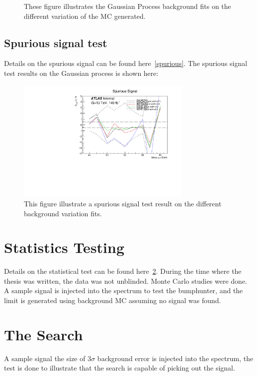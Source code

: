 \begin{figure}[!htb]
\begin{center}
        \caption{
        These figure illustrates the Gaussian Process background fits on the different variation of the MC generated. }
    \end{center}
\end{figure}



\subsection{Spurious signal test}
Details on the spurious signal can be found here~\ref{spurious}.
The spurious signal test results on the Gaussian process is shown here:

\begin{figure}[!htb]
    \begin{center}
        \includegraphics[width=0.75\textwidth]{figures/chapter_dimuon/spurious}        
        \caption{
        This figure illustrate a spurious signal test result on the different background variation fits.}
            \label{fig:dimuonstudies}
    \end{center}
\end{figure}


\section{Statistics Testing}
Details on the statistical test can be found here~\ref{}. During the time where the thesis was written, the data was not unblinded. Monte Carlo studies were done. A sample signal is injected into the spectrum to test the bumphunter, and the limit is generated using background MC assuming no signal was found.

\section{The Search}
A sample signal the size of 3$\sigma$ background error is injected into the spectrum, the test is done to illustrate that the search is capable of picking out the signal.
    


